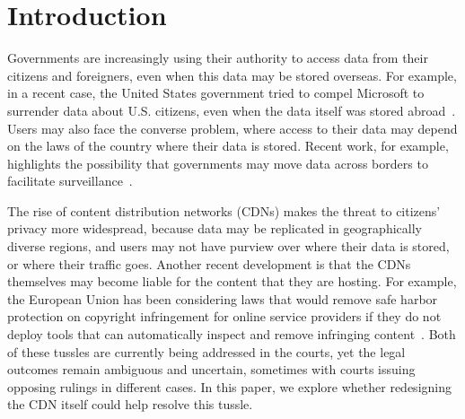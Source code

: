 \section{Introduction}
\label{sec:intro}

Governments are increasingly using their authority to access data from
their citizens and foreigners, even when this data may be stored overseas.  For
example, in a
recent case, the United States government tried to compel Microsoft to
surrender data about U.S. citizens, even when the data itself was stored
abroad~\cite{microsoft_ireland}. Users may also face the converse problem, where access to their data
may depend on the laws of the country where their data is stored. Recent work,
for example, highlights the possibility that governments may move data across
borders to facilitate surveillance~\cite{arnbak2015loopholes}.  

The rise of content distribution networks (CDNs) makes the threat to citizens'
privacy more widespread, because data may be replicated in geographically
diverse regions, and users may not have purview over where their data is
stored, or where their traffic goes. Another recent development is that the
CDNs themselves may become liable for the content that they are hosting. For
example, the European Union has been considering laws that would remove safe
harbor protection on copyright infringement for online service providers if
they do not deploy tools that can automatically inspect and remove infringing
content~\cite{eu-copyright}. Both of these tussles are currently being
addressed in the courts, yet the legal outcomes remain ambiguous and
uncertain, sometimes with courts issuing opposing rulings in different cases.
In this paper, we explore whether redesigning the CDN itself could help
resolve this tussle.



